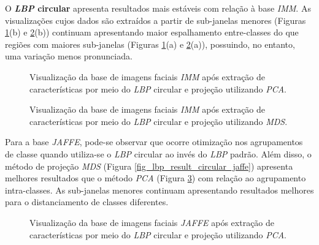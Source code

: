 \documentclass[conference]{IEEEtran}
\begin{document}
O \textbf{\textit{LBP} circular} apresenta resultados mais estáveis com relação à base \textit{IMM}. As visualizações cujos dados são extraídos a partir de sub-janelas menores (Figuras \ref{fig_lbp_result_circular_imm_pca}(b) e \ref{fig_lbp_result_circular_imm}(b)) continuam apresentando maior espalhamento entre-classes do que regiões com maiores sub-janelas (Figuras \ref{fig_lbp_result_circular_imm_pca}(a) e \ref{fig_lbp_result_circular_imm}(a)), possuindo, no entanto, uma variação menos pronunciada.

\begin{figure}[h]
\center
\leavevmode
{}
\qquad
{}
\caption{Visualização da base de imagens faciais \textit{IMM} após extração de características por meio do \textit{LBP} circular e projeção utilizando \textit{PCA}.}
 \label{fig_lbp_result_circular_imm_pca}
\end{figure}

\begin{figure}[h]
\center
\leavevmode
{}
\qquad
{}
\caption{Visualização da base de imagens faciais \textit{IMM} após extração de características por meio do \textit{LBP} circular e projeção utilizando \textit{MDS}.}
 \label{fig_lbp_result_circular_imm}
\end{figure}

Para a base \textit{JAFFE}, pode-se observar que ocorre otimização nos agrupamentos de classe quando utiliza-se o \textit{LBP} circular ao invés do \textit{LBP} padrão. Além disso, o método de projeção \textit{MDS} (Figura \ref{fig_lbp_result_circular_jaffe}) apresenta melhores resultados que o método \textit{PCA} (Figura \ref{fig_lbp_result_circular_jaffe_pca}) com relação ao agrupamento intra-classes. As sub-janelas menores continuam apresentando resultados melhores para o distanciamento de classes diferentes.

\begin{figure}[h]
\center
\leavevmode
{}
\qquad
{}
\caption{Visualização da base de imagens faciais \textit{JAFFE} após extração de características por meio do \textit{LBP} circular e projeção utilizando \textit{PCA}.}
 \label{fig_lbp_result_circular_jaffe_pca}
\end{figure}
\end{document}
